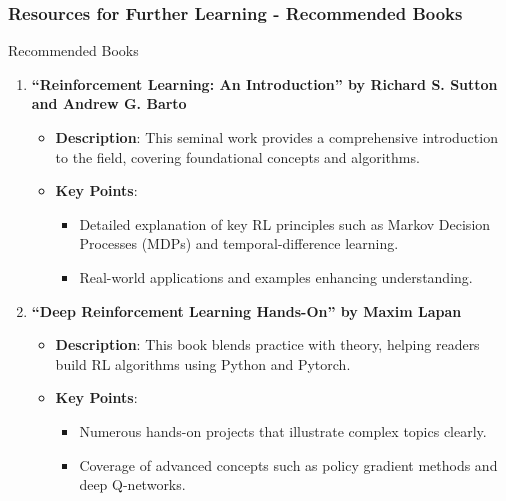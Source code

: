 \documentclass[aspectratio=169]{beamer}
\begin{document}
\begin{frame}[fragile]
    \frametitle{Resources for Further Learning - Recommended Books}
    \begin{block}{Recommended Books}
        \begin{enumerate}
            \item \textbf{“Reinforcement Learning: An Introduction” by Richard S. Sutton and Andrew G. Barto}
                \begin{itemize}
                    \item \textbf{Description}: This seminal work provides a comprehensive introduction to the field, covering foundational concepts and algorithms.
                    \item \textbf{Key Points}:
                        \begin{itemize}
                            \item Detailed explanation of key RL principles such as Markov Decision Processes (MDPs) and temporal-difference learning.
                            \item Real-world applications and examples enhancing understanding.
                        \end{itemize}
                \end{itemize}

            \item \textbf{“Deep Reinforcement Learning Hands-On” by Maxim Lapan}
                \begin{itemize}
                    \item \textbf{Description}: This book blends practice with theory, helping readers build RL algorithms using Python and Pytorch.
                    \item \textbf{Key Points}:
                        \begin{itemize}
                            \item Numerous hands-on projects that illustrate complex topics clearly.
                            \item Coverage of advanced concepts such as policy gradient methods and deep Q-networks.
                        \end{itemize}
                \end{itemize}
        \end{enumerate}
    \end{block}
\end{frame}
\end{document}
